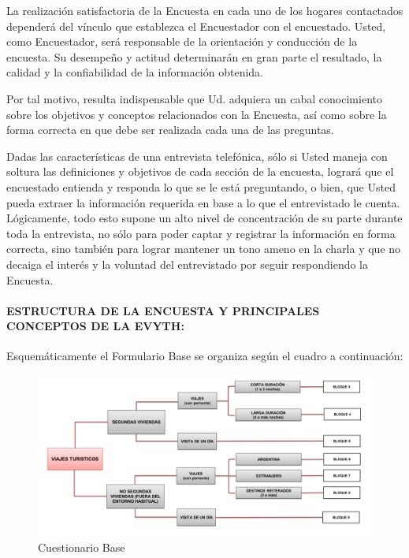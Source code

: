 \documentclass[
  openany]{book}
\begin{document}
La realización satisfactoria de la Encuesta en cada uno de los hogares contactados dependerá del vínculo que establezca el Encuestador con el encuestado. Usted, como Encuestador, será responsable de la orientación y conducción de la encuesta. Su desempeño y actitud determinarán en gran parte el resultado, la calidad y la confiabilidad de la información obtenida.

Por tal motivo, resulta indispensable que Ud. adquiera un cabal conocimiento sobre los objetivos y conceptos relacionados con la Encuesta, así como sobre la forma correcta en que debe ser realizada cada una de las preguntas.

Dadas las características de una entrevista telefónica, sólo si Usted maneja con soltura las definiciones y objetivos de cada sección de la encuesta, logrará que el encuestado entienda y responda lo que se le está preguntando, o bien, que Usted pueda extraer la información requerida en base a lo que el entrevistado le cuenta. Lógicamente, todo esto supone un alto nivel de concentración de su parte durante toda la entrevista, no sólo para poder captar y registrar la información en forma correcta, sino también para lograr mantener un tono ameno en la charla y que no decaiga el interés y la voluntad del entrevistado por seguir respondiendo la Encuesta.

\hypertarget{estructura-de-la-encuesta-y-principales-conceptos-de-la-evyth}{%
\paragraph{\texorpdfstring{\textbf{ESTRUCTURA DE LA ENCUESTA Y PRINCIPALES CONCEPTOS DE LA EVYTH:}}{ESTRUCTURA DE LA ENCUESTA Y PRINCIPALES CONCEPTOS DE LA EVYTH:}}\label{estructura-de-la-encuesta-y-principales-conceptos-de-la-evyth}}

Esquemáticamente el Formulario Base se organiza según el cuadro a continuación:

\begin{figure}

{\centering \includegraphics[width=1\linewidth]{imagenes/figura6-20} 

}

\caption{Cuestionario Base}\label{fig:Cuestionario}
\end{figure}
\end{document}
